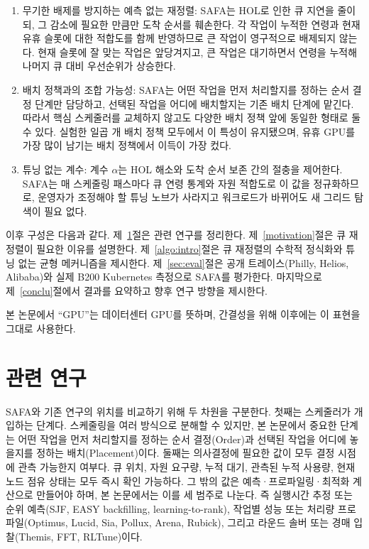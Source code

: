 \documentclass{ieeetj}
\begin{document}
\begin{enumerate}
\item 무기한 배제를 방지하는 예측 없는 재정렬: SAFA는 HOL로 인한 큐 지연을 줄이되, 그 감소에 필요한 만큼만 도착 순서를 훼손한다. 각 작업이 누적한 연령과 현재 유휴 슬롯에 대한 적합도를 함께 반영하므로 큰 작업이 영구적으로 배제되지 않는다. 현재 슬롯에 잘 맞는 작업은 앞당겨지고, 큰 작업은 대기하면서 연령을 누적해 나머지 큐 대비 우선순위가 상승한다.
\item 배치 정책과의 조합 가능성: SAFA는 어떤 작업을 먼저 처리할지를 정하는 순서 결정 단계만 담당하고, 선택된 작업을 어디에 배치할지는 기존 배치 단계에 맡긴다. 따라서 핵심 스케줄러를 교체하지 않고도 다양한 배치 정책 앞에 동일한 형태로 둘 수 있다. 실험한 일곱 개 배치 정책 모두에서 이 특성이 유지됐으며, 유휴 GPU를 가장 많이 남기는 배치 정책에서 이득이 가장 컸다.
\item 튜닝 없는 계수: 계수 $\alpha$는 HOL 해소와 도착 순서 보존 간의 절충을 제어한다. SAFA는 매 스케줄링 패스마다 큐 연령 통계와 자원 적합도로 이 값을 정규화하므로, 운영자가 조정해야 할 튜닝 노브가 사라지고 워크로드가 바뀌어도 새 그리드 탐색이 필요 없다.
\end{enumerate}

이후 구성은 다음과 같다. 제~\ref{Related}절은 관련 연구를 정리한다. 제~\ref{motivation}절은 큐 재정렬이 필요한 이유를 설명한다. 제~\ref{algo:intro}절은 큐 재정렬의 수학적 정식화와 튜닝 없는 균형 메커니즘을 제시한다. 제~\ref{sec:eval}절은 공개 트레이스(Philly, Helios, Alibaba)와 실제 B200 Kubernetes 측정으로 SAFA를 평가한다. 마지막으로 제~\ref{conclu}절에서 결과를 요약하고 향후 연구 방향을 제시한다.

본 논문에서 ``GPU''는 데이터센터 GPU를 뜻하며, 간결성을 위해 이후에는 이 표현을 그대로 사용한다.

\section{관련 연구}\label{Related}
SAFA와 기존 연구의 위치를 비교하기 위해 두 차원을 구분한다. 첫째는 스케줄러가 개입하는 단계다. 스케줄링을 여러 방식으로 분해할 수 있지만, 본 논문에서 중요한 단계는 어떤 작업을 먼저 처리할지를 정하는 순서 결정(Order)과 선택된 작업을 어디에 놓을지를 정하는 배치(Placement)이다. 둘째는 의사결정에 필요한 값이 모두 결정 시점에 관측 가능한지 여부다. 큐 위치, 자원 요구량, 누적 대기, 관측된 누적 사용량, 현재 노드 점유 상태는 모두 즉시 확인 가능하다. 그 밖의 값은 예측·프로파일링·최적화 계산으로 만들어야 하며, 본 논문에서는 이를 세 범주로 나눈다. 즉 실행시간 추정 또는 순위 예측(SJF, EASY backfilling, learning-to-rank), 작업별 성능 또는 처리량 프로파일(Optimus, Lucid, Sia, Pollux, Arena, Rubick), 그리고 라운드 솔버 또는 경매 입찰(Themis, FFT, RLTune)이다.
\end{document}
